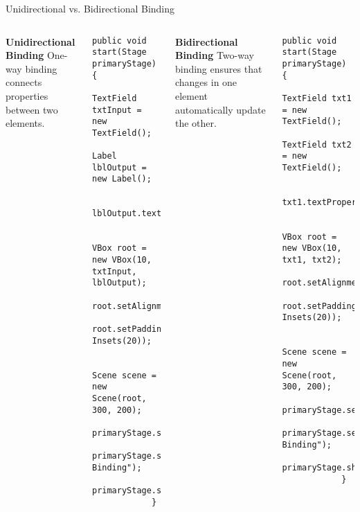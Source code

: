 \documentclass[aspectratio=169, table]{beamer}
\begin{document}
\begin{frame}[fragile]{Unidirectional vs. Bidirectional Binding}
	\vspace{10pt}
	\begin{columns}[t]
		\textbf{Unidirectional Binding}  
		One-way binding connects properties between two elements.
		\begin{lstlisting}[style=JavaStyle]
			public void start(Stage primaryStage) {
				TextField txtInput = new TextField();
				Label lblOutput = new Label();
				
				lblOutput.textProperty().bind(txtInput.textProperty());
				
				VBox root = new VBox(10, txtInput, lblOutput);
				root.setAlignment(Pos.CENTER);
				root.setPadding(new Insets(20));
				
				Scene scene = new Scene(root, 300, 200);
				primaryStage.setScene(scene);
				primaryStage.setTitle("Unidirectional Binding");
				primaryStage.show();
			}
		\end{lstlisting}
		
		\textbf{Bidirectional Binding}  
		Two-way binding ensures that changes in one element automatically update the other.
		\begin{lstlisting}[style=JavaStyle]
			public void start(Stage primaryStage) {
				TextField txt1 = new TextField();
				TextField txt2 = new TextField();
				
				txt1.textProperty().bindBidirectional(txt2.textProperty());
				
				VBox root = new VBox(10, txt1, txt2);
				root.setAlignment(Pos.CENTER);
				root.setPadding(new Insets(20));
				
				Scene scene = new Scene(root, 300, 200);
				primaryStage.setScene(scene);
				primaryStage.setTitle("Bidirectional Binding");
				primaryStage.show();
			}
		\end{lstlisting}
	\end{columns}
\end{frame}
\end{document}
